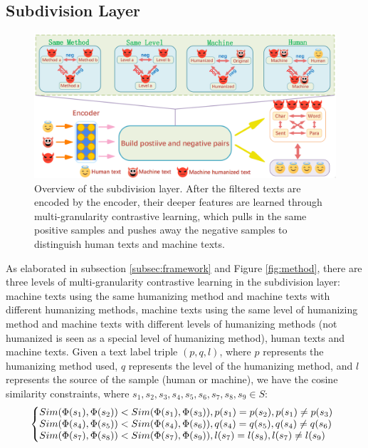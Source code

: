 \documentclass[11pt]{article}
\begin{document}
	\subsection{Subdivision Layer}
	\label{sec:second_stage}
	\begin{figure}
    \centering
    \includegraphics[width=0.9\linewidth]{pics/second-frame.png}
    \caption{Overview of the subdivision layer. After the filtered texts are encoded by the encoder, their deeper features are learned through multi-granularity contrastive learning, which pulls in the same positive samples and pushes away the negative samples to distinguish human texts and machine texts.}
\label{fig:second-detector}
\end{figure}
	As elaborated in subsection \ref{subsec:framework} and Figure \ref{fig:method}, there are three levels of multi-granularity contrastive learning in the subdivision layer: machine texts using the same humanizing method and machine texts with different humanizing methods, machine texts using the same level of humanizing method and machine texts with different levels of humanizing methods (not humanized is seen as a special level of humanizing method), human texts and machine texts. Given a text label triple $(p, q, l)$, where $p$ represents the humanizing method used, $q$ represents the level of the humanizing method, and $l$ represents the source of the sample (human or machine), we have the cosine similarity constraints, where $s_1,s_2,s_3,s_4,s_5,s_6,s_7,s_8,s_9 \in S$:
	\begin{equation}
    \label{ineq:sim_equal}
    \left\{
    \begin{array}{@{\extracolsep{\fill}}lllll}
      Sim(\Phi(s_1),\Phi(s_2))<Sim(\Phi(s_1),\Phi(s_3)),p(s_1)=p(s_2),p(s_1)\neq p(s_3)\\
      Sim(\Phi(s_4),\Phi(s_5))<Sim(\Phi(s_4),\Phi(s_6)),q(s_4)=q(s_5),q(s_4)\neq q(s_6)\\
      Sim(\Phi(s_7),\Phi(s_8))<Sim(\Phi(s_7),\Phi(s_9)),l(s_7)=l(s_8),l(s_7)\neq l(s_9)
    \end{array}
    \right.
    \end{equation}
\end{document}
